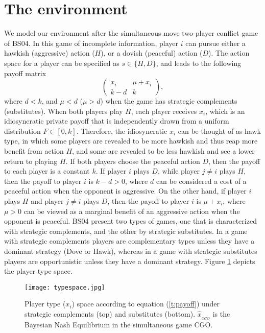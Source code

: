 \documentclass[12pt, letterpaper]{article}
\theoremstyle{plain}
\begin{document}
\section{The environment}
\label{sec:model}
We model our environment after the simultaneous move two-player conflict game of BS04. In this game of incomplete information, player $i$ can pursue either a hawkish (aggressive) action ($H$), or a dovish (peaceful) action ($D$). The action space for a player can be specified as $s\in\{H,D\}$, and leads to the following payoff matrix
\begin{equation}
\begin{pmatrix}
x_i & \mu+x_i \\
k-d & k 
\label{t:payoff}
\end{pmatrix},
\end{equation}
where $d<k$, and $\mu<d$ ($\mu > d$) when the game has strategic complements (substitutes). When both players play $H$, each player receives $x_i$, which is an idiosyncratic private payoff that is independently drawn from a uniform distribution $F\in [0,k]$. Therefore, the idiosyncratic $x_i$ can be thought of as hawk type, in which some players are revealed to be more hawkish and thus reap more benefit from action $H$, and some are revealed to be less hawkish and see a lower return to playing $H$. If both players choose the peaceful action $D$, then the payoff to each player is a constant $k$. If player $i$ plays $D$, while player $j\neq i$ plays $H$, then the payoff to player $i$ is $k-d>0$, where $d$ can be considered a cost of a peaceful action when the opponent is aggressive. On the other hand, if player $i$ plays $H$ and player $j\neq i$ plays $D$, then the payoff to player $i$ is $\mu+x_i$, where $\mu>0$ can be viewed as a marginal benefit of an aggressive action when the opponent is peaceful. BS04 present two types of games, one that is characterized with strategic complements, and the other by strategic substitutes.  In a game with strategic complements players are complementary types unless they have a dominant strategy (Dove or Hawk), whereas in a game with strategic substitutes players are opportunistic unless they have a dominant strategy. Figure \ref{fig:typespace} depicts the player type space.

\begin{center}
\begin{figure}[ht]
\centering{}%
\texttt{[image: typespace.jpg]}%
\caption{Player type ($x_i$) space according to equation (\ref{t:payoff}) under strategic complements (top) and substitutes (bottom). $\hat{x}_{_{CGO}}$ is the Bayesian Nash Equilibrium in the simultaneous game CGO.} 
\label{fig:typespace}
\end{figure}
\end{center}
\end{document}
